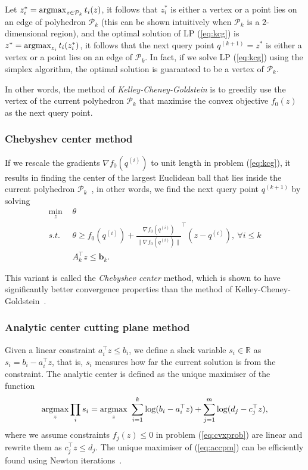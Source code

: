 Let $z_i^* = \operatorname*{argmax}_{z \in \mathcal{P}_k} t_i(z)$,
it follows that $z_i^*$ is either a vertex or a point lies on an edge of polyhedron $\mathcal{P}_k$
(this can be shown intuitively when $\mathcal{P}_k$ is a $2$-dimensional region),
and the optimal solution of LP (\ref{eq:kcg}) is $z^* = \operatorname*{argmax}_{z_i} t_i(z_i^*)$,
it follows that the next query point $q^{(k+1)} = z^*$ is either a vertex or a point lies on an edge of $\mathcal{P}_k$.
In fact, if we solve LP (\ref{eq:kcg}) using the simplex algorithm, the optimal solution is guaranteed to be a vertex of $\mathcal{P}_k$.

In other words,
the method of \emph{Kelley-Cheney-Goldstein} is to greedily use the vertex of the current polyhedron $\mathcal{P}_k$ 
that maximise the convex objective $f_0(z)$ as the next query point.



\subsubsection{Chebyshev center method}
\label{sec:chebyshev}

If we rescale the gradients $\nabla f_0(q^{(i)})$ to unit length in problem (\ref{eq:kcg}), 
it results in finding the center of the largest Euclidean ball that lies inside the current polyhedron $\mathcal{P}_k$~\cite{elzinga1975central},
in other words, we find the next query point $q^{(k+1)}$ by solving
\begin{equation}
\label{eq:chebyshev}
\begin{aligned}
\min_{z} ~& \theta  \\
s.t.~~   ~& \theta \ge f_0(q^{(i)}) + \frac{\nabla f_0(q^{(i)})}{\|\nabla f_0(q^{(i)})\|} ^\top (z - q^{(i)}),~ \forall i \le k \\
          & A_k^\top z \le \mathbf{b}_k.
\end{aligned}
\end{equation}

This variant is called the \emph{Chebyshev center} method, which is shown to have significantly better convergence properties than the method of Kelley-Cheney-Goldstein~\cite{goffin2002convex}.


\subsubsection{Analytic center cutting plane method}
\label{sec:accpm}

Given a linear constraint $a_i^\top z \le b_i$, we define a slack variable $s_i \in \mathbb{R}$ as $s_i = b_i - a_i^\top z$,
that is, $s_i$ measures how far the current solution is from the constraint.
The analytic center is defined as the unique maximiser of the function~\cite{wulff2013analytic}
\begin{equation}
\label{eq:accpm}
\operatorname*{argmax}_z \prod_i s_i = \operatorname*{argmax}_z ~ \sum_{i=1}^k \log(b_i - a_i^\top z) + \sum_{j=1}^m \log(d_j - c_j^\top z),
\end{equation}
where we assume constraints $f_j(z) \le 0$ in problem (\ref{eq:cvxprob}) are linear and rewrite them as $c_j^\top z \le d_j$.
The unique maximiser of (\ref{eq:accpm}) can be efficiently found using Newton iterations~\cite{goffin2002convex}.


